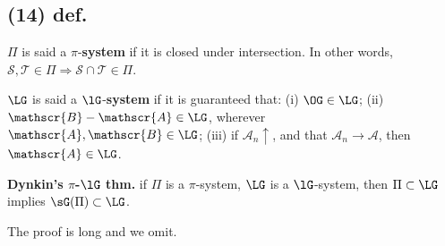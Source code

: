 \documentclass[12pt]{article}
\newcommand{\Ip}{\Rightarrow} %
\newcommand{\SF}[1]{ \mathscr{#1} }%
\newcommand{\Ss}[1]{\textsf{\textbf{#1}}}%
\begin{document}
\subsection*{(14) def.} \(\Pi\) is said a \(\pi\)-\Ss{system} if it is closed under intersection. 
In other words, \(\SF{S}, \SF{T} \in \Pi \Ip \SF{S} \cap \SF{T} \in \Pi\). \par
\(\LG\) is said a \(\lG\)-\Ss{system} if it is guaranteed that:
(i) \(\OG \in \LG\);
(ii) \(\SF{B} -\SF{A} \in \LG\), wherever \(\SF{A} ,\SF{B} \in \LG\); 
(iii) if \(\SF{A}_n \uparrow\), and that \(\SF{A}_n \to \SF{A}\), then \(\SF{A} \in \LG\). \par
\Ss{Dynkin's \(\pi\)-\(\lG\) thm.}  if \(\Pi\) is a \(\pi\)-system, \(\LG\) is a \(\lG\)-system, then \(\Pi \subset \LG\) implies \(\sG(\Pi) \subset \LG\). \par
The proof is long and we omit. 
\end{document}
